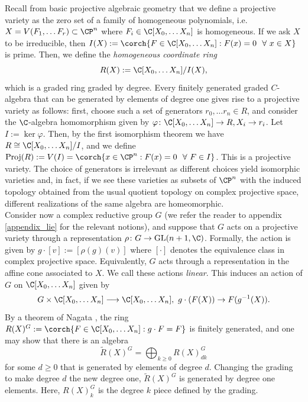 {Recall from basic projective algebraic geometry that we define a projective variety as the zero set of a family of homogeneous polynomials, i.e. \(X=V(F_1, \ldots F_r) \subset \CP^{n}\) where \(F_i\in \C[X_0, \ldots X_n]\) is homogeneous. If we ask \(X\) to be irreducible, then \(I(X):=\corch{F \in \C[X_0, \ldots X_n]: F(x)=0 \ \ \forall \ x \in X}\) is prime. Then, we define the \textit{homogeneous coordinate ring}
\[
R(X):=\C[X_0, \ldots X_n]/I(X),
\]
which is a graded ring graded by degree. Every finitely generated graded \(C\)-algebra that can be generated by elements of degree one gives rise to a projective variety as follows: first, choose such a set of generators \(r_0, \ldots r_n\in R\), and consider the \(\C\)-algebra homomorphism given by \(\varphi\colon \C[X_0, \ldots X_n]\to R, X_i \to r_i\). Let \(I:=\ker \varphi\). Then, by the first isomorphism theorem we have \(R\cong \C[X_0, \ldots X_n]/I\), and we define \(\mathrm{Proj}(R):=V(I)=\corch{x\in \CP^n: F(x)=0 \ \ \forall \ F \in I}\). This is a projective variety. The choice of generators is irrelevant as different choices yield isomorphic varieties and, in fact, if we see these varieties as subsets of \(\CP^n\) with the induced topology obtained from the usual quotient topology on complex projective space, different realizations of the same algebra are homeomorphic. \\

Consider now a complex reductive group \(G\) (we refer the reader to appendix \ref{appendix_lie} for the relevant notions), and suppose that \(G\) acts on a projective variety through a representation \(\rho\colon G \to \mathrm{GL}(n+1, \C)\). Formally, the action is given by \(g\cdot [v]:=[\rho(g)(v)]\) where \([\cdot]\) denotes the equivalence class in complex projective space. Equivalently, \(G\) acts through a representation in the affine cone associated to \(X\). We call these actions \textit{linear}. This induces an action of \(G\) on \(\C[X_0, \ldots X_n]\) given by
\[
G \times \C[X_0, \ldots X_n] \longrightarrow \C[X_0, \ldots X_n], \ g\cdot (F(X)) \to F(g^{-1}(X)).
\]
By a theorem of Nagata \parencite{nagata1963invariants}, the ring  \(R(X)^G:=\corch{F\in \C[X_0, \ldots X_n]: g\cdot F=F } \) is finitely generated, and one may show that there is an algebra 
\[
\tilde{R}(X)^G=\bigoplus_{k \ge 0} R(X)^G_{dk}
\]
for some \(d \geq 0\) that is generated by elements of degree \(d\). Changing the grading to make degree \(d\) the new degree one, \(\tilde{R}(X)^G\) is generated by degree one elements. Here, \(R(X)^G_k\) is the degree \(k\) piece defined by the grading.

}
